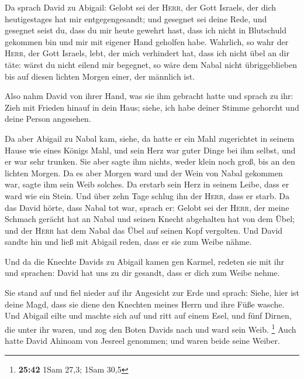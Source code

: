  Da sprach David zu Abigail: Gelobt sei der
\textsc{Herr}, der Gott Israels, der dich heutigestages hat mir
entgegengesandt;  und gesegnet sei deine Rede, und
gesegnet seist du, dass du mir heute gewehrt hast, dass ich nicht in
Blutschuld gekommen bin und mir mit eigener Hand geholfen habe.
 Wahrlich, so wahr der \textsc{Herr}, der Gott Israels,
lebt, der mich verhindert hat, dass ich nicht übel an dir täte: wärst du
nicht eilend mir begegnet, so wäre dem Nabal nicht übriggeblieben bis
auf diesen lichten Morgen einer, der männlich ist.

 Also nahm David von ihrer Hand, was sie ihm gebracht
hatte und sprach zu ihr: Zieh mit Frieden hinauf in dein Haus; siehe,
ich habe deiner Stimme gehorcht und deine Person angesehen.

 Da aber Abigail zu Nabal kam, siehe, da hatte er ein
Mahl zugerichtet in seinem Hause wie eines Königs Mahl, und sein Herz
war guter Dinge bei ihm selbst, und er war sehr trunken. Sie aber sagte
ihm nichts, weder klein noch groß, bis an den lichten Morgen.
 Da es aber Morgen ward und der Wein von Nabal gekommen
war, sagte ihm sein Weib solches. Da erstarb sein Herz in seinem Leibe,
dass er ward wie ein Stein.  Und über zehn Tage schlug
ihn der \textsc{Herr}, dass er starb.  Da das David
hörte, dass Nabal tot war, sprach er: Gelobt sei der \textsc{Herr}, der
meine Schmach gerächt hat an Nabal und seinen Knecht abgehalten hat von
dem Übel; und der \textsc{Herr} hat dem Nabal das Übel auf seinen Kopf
vergolten. Und David sandte hin und ließ mit Abigail reden, dass er sie
zum Weibe nähme.

 Und da die Knechte Davids zu Abigail kamen gen Karmel,
redeten sie mit ihr und sprachen: David hat uns zu dir gesandt, dass er
dich zum Weibe nehme.

 Sie stand auf und fiel nieder auf ihr Angesicht zur Erde
und sprach: Siehe, hier ist deine Magd, dass sie diene den Knechten
meines Herrn und ihre Füße wasche.  Und Abigail eilte und
machte sich auf und ritt auf einem Esel, und fünf Dirnen, die unter ihr
waren, und zog den Boten Davids nach und ward sein Weib. \footnote{\textbf{25:42}
  1Sam 27,3; 1Sam 30,5}  Auch hatte David Ahinoam von
Jesreel genommen; und waren beide seine Weiber.

